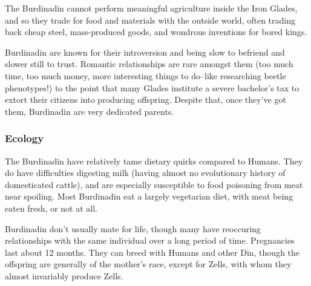 \documentclass[oneside,11pt,english]{book}
\begin{document}
 

The Burdinadin cannot perform meaningful agriculture inside the Iron Glades, and so they trade for food 
and materials with the outside world, often trading back cheap steel, mass-produced goods, and wondrous 
inventions for bored kings. 

 


Burdinadin are known for their introversion and being slow to befriend and slower still to trust. Romantic 
relationships are rare amongst them (too much time, too much money, more interesting things to do--like 
researching beetle phenotypes!) to the point that many Glades institute a severe bachelor’s tax to extort 
their citizens into producing offspring. Despite that, once they’ve got them, Burdinadin are very dedicated 
parents. 

 

\subsubsection*{Ecology} 
The Burdinadin have relatively tame dietary quirks compared to Humans. They do have difficulties 
digesting milk (having almost no evolutionary history of domesticated cattle), and are especially 
susceptible to food poisoning from meat near spoiling. Most Burdinadin eat a largely vegetarian diet, with 
meat being eaten fresh, or not at all. 


Burdinadin don’t usually mate for life, though many have reoccuring relationships with the same individual over a long period of time. Pregnancies last about 12 months. They can breed with Humans and other Din, though the offspring are generally of the mother's race, except for Zells, with whom they almost invariably produce Zells. 
\end{document}
